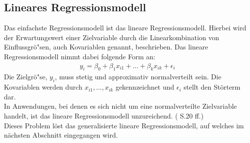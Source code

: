 \documentclass[12pt]{scrreprt}
\begin{document}
\subsection{Lineares Regressionsmodell}
Das einfachste Regressionsmodell ist das lineare Regressionsmodell. Hierbei wird der Erwartungswert einer Zielvariable durch die Linearkombination von Einflussgrö"sen, auch Kovariablen genannt, beschrieben. Das lineare Regressionsmodell nimmt dabei folgende Form an:
\begin{align}
y_{i}= \beta_{0}+\beta_{1}x_{i1}+...+\beta_{k}x_{ik}+\epsilon_{i}
\end{align}
Die Zielgrö"se, $y_{i}$, muss stetig und approximativ normalverteilt sein. Die Kovariablen werden durch $x_{i1},...,x_{ik}$ gekennzeichnet und $\epsilon_{i}$ stellt den Störterm dar. \\
In Anwendungen, bei denen es sich nicht um eine normalverteilte Zielvariable handelt, ist das lineare Regressionsmodell unzureichend. (\cite{fahrmeir2007regression} S.20 ff.) \\
Dieses Problem löst das generalisierte lineare Regressionsmodell, auf welches im nächsten Abschnitt eingegangen wird. 
\end{document}
